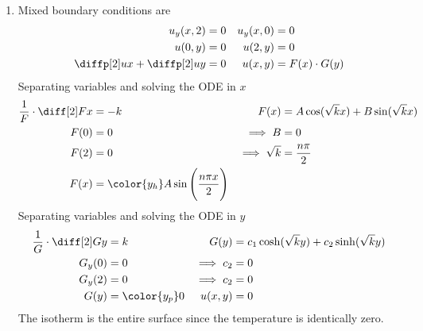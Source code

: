\begin{enumerate}
\begin{enumerate}
              \item Mixed boundary conditions are
                    \begin{align}
                        u_y(x, 2)     & = 0               &
                        u_y(x, 0)     & = 0                 \\
                        u(0, y)       & = 0               &
                        u(2, y)       & = 0                 \\
                        \diffp[2] ux
                        +\diffp[2] uy & = 0               &
                        u(x, y)       & = F(x) \cdot G(y)
                    \end{align}
                    Separating variables and solving the ODE in $ x $
                    \begin{align}
                        \frac{1}{F} \cdot \diff[2] Fx & = -k                      &
                        F(x)                          & = A\cos(\sqrt{k}x)
                        + B\sin(\sqrt{k}x)                                          \\
                        F(0)                          & = 0                       &
                        \implies B                    & = 0                         \\
                        F(2)                          & = 0                       &
                        \implies \sqrt{k}             & = \frac{n\pi}{2}            \\
                        F(x)                          & = \color{y_h} A\sin\Bigg(
                        \frac{n\pi x}{2} \Bigg)
                    \end{align}
                    Separating variables and solving the ODE in $ y $
                    \begin{align}
                        \frac{1}{G} \cdot \diff[2] Gy & = k                    &
                        G(y)                          & = c_1 \cosh(\sqrt{k}y)
                        + c_2\sinh(\sqrt{k}y)                                    \\
                        G_y(0)                        & = 0                    &
                        \implies c_2                  & = 0                      \\
                        G_y(2)                        & = 0                    &
                        \implies c_2                  & = 0                      \\
                        G(y)                          & = \color{y_p} 0        &
                        u(x, y)                       & = 0
                    \end{align}
                    The isotherm is the entire surface since the temperature is
                    identically zero.


\end{enumerate}
\end{enumerate}
